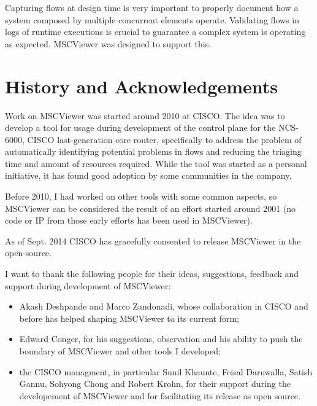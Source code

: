 \documentclass[11pt, twoside, titlepage]{book}
\newcommand{\prog}{MSCViewer}
\begin{document}
Capturing flows at design time is very
important to properly document how a system composed by multiple concurrent
elements operate. Validating flows in logs of runtime executions is crucial to
guarantee a complex system is operating as expected. \prog{} was designed  to
support this.


\section{History and Acknowledgements}
Work on \prog{} was started around 2010 at CISCO. The idea was to develop a tool
for usage during development of the control plane for the NCS-6000, CISCO 
last-generation core router, specifically to address the problem of
automatically identifying potential problems in flows and reducing the triaging 
time and amount of resources required. While the tool was started as a personal
initiative, it has found good adoption by some communities in the company. 

Before 2010, I had worked on other tools with some common aspects, so \prog{} can
be considered the result of an effort started around 2001 
(no code or IP from those early efforts has been used in \prog{}). 

As of Sept. 2014 CISCO has gracefully consented to release \prog{} in the
open-source. 

I want to thank the following people for their ideas, suggestions, feedback and
support during development of \prog{}:

\begin{itemize}
\item Akash Deshpande and Marco Zandonadi, whose collaboration in CISCO and before
has helped shaping \prog{} to its current form;

\item Edward Conger, for his suggestions, observation and his ability to push
the boundary of \prog{} and other tools I developed;

\item the CISCO managment, in particular Sunil Khaunte, Feisal Daruwalla, Satish
Gannu, Sohyong Chong and Robert Krohn, for their support during the developement
of \prog{} and for facilitating its release as open source.
\end{itemize} 
\end{document}
